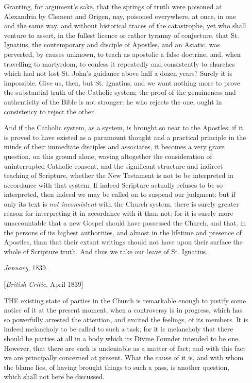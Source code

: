 Granting, for argument's sake, that the springs of truth were poisoned
at Alexandria by Clement and Origen, nay, poisoned everywhere, at
once, in one and the same way, and without historical traces of the
catastrophe, yet who shall venture to assert, in the fullest licence
or rather tyranny of conjecture, that St. Ignatius, the
contemporary and disciple of Apostles, and an Asiatic, was perverted,
by causes unknown, to teach as apostolic a false doctrine, and, when
travelling to martyrdom, to confess it repeatedly and consistently to
churches which had not lost St. John's guidance above half a dozen
years? Surely it is impossible. Give us, then, but St. Ignatius, and
we want nothing more to prove the substantial truth of the Catholic
system; the proof of the genuineness and authenticity of the Bible is
not stronger; he who rejects the one, ought in consistency to reject
the other.

And if the Catholic system, as a system, is
brought so near to the Apostles; if it is proved to have existed as a
paramount thought and a practical principle in the minds of their
immediate disciples and associates, it becomes a very grave question,
on this ground alone, waving altogether the consideration of
uninterrupted Catholic consent, and the significant structure and
indirect teaching of Scripture, whether the New Testament is not to be
interpreted in accordance with that system. If indeed Scripture
actually refuses to be so interpreted, then indeed we may be called on
to suspend our judgment; but if only its text is \emph{not inconsistent} with
the Church system, there is surely greater reason for interpreting it
in accordance with it than not; for it is surely more unaccountable
that a new Gospel should have possessed the Church, and that, in the
persons of its highest authorities, and almost in the lifetime and
presence of Apostles, than that their extant writings should not have
upon their surface the whole of Scripture truth. And thus we take our
leave of St. Ignatius.

\emph{January}, 1839.


[\emph{British Critic}, April 1839]

THE
existing state of parties in the Church is remarkable enough to
justify some notice of it at the present moment, when a controversy is
in progress, which has so powerfully arrested the attention, and
excited the feelings, of its members. It is indeed melancholy to be
called to such a task; for it is melancholy that there should be
parties at all in a body which its Divine Founder intended to be one.
However, that there are such is undeniable as a matter of fact; and
with this fact we are principally concerned at present. What the cause
of it is, and with whom the blame lies, of having brought things to
such a pass, is another question, which shall not here be discussed.


